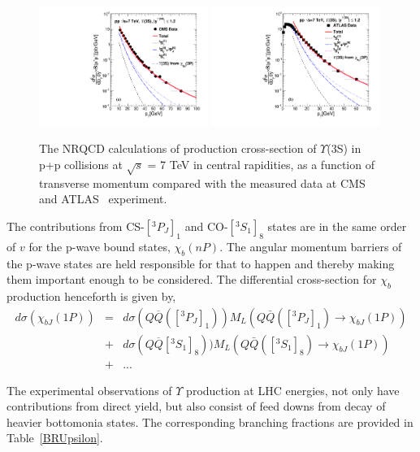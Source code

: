 \documentclass[review]{elsarticle}
\begin{document}
\begin{figure}[!h]
  \centering
  \includegraphics[width=0.49\textwidth]{Figures/NRQCD_Beauty/Fig1a_Y3S_CMS.pdf}
  \includegraphics[width=0.49\textwidth]{Figures/NRQCD_Beauty/Fig1b_Y3S_ATLAS.pdf} 
  \caption{\small{The NRQCD calculations of production cross-section of $\Upsilon$(3S) in p+p collisions at 
      $\sqrt{s}$ = 7 TeV in central rapidities, as a function of transverse momentum compared with the measured data 
      at CMS~\cite{Khachatryan:2015qpa} and ATLAS~\cite{Aad:2012dlq} experiment.} }
  \label{Fig:SigmaY3SCMS}
\end{figure}

The contributions from CS-$[^3P_J]_1$ and CO-$[^3S_1]_8$ states are in the same order
of $v$ for the p-wave bound states, $\chi_{b}(nP)$. The angular momentum barriers of the p-wave
states are held responsible for that to happen and thereby making them important enough
to be considered. The differential cross-section for $\chi_b$ production
henceforth is given by,
\begin{eqnarray}
  d\sigma(\chi_{bJ}(1P)) &=& d\sigma(Q\overline{Q}([^3P_J]_{1}))
  M_{L}(Q\bar{Q}([^3P_J]_{1})\rightarrow \chi_{bJ}(1P)) \nonumber \\
  &+& d\sigma(Q\overline{Q}[^3S_1]_{8}))
  M_{L}(Q\bar{Q}([^3S_1]_{8})\rightarrow \chi_{bJ}(1P))  \nonumber \\
  &+& ...
  \label{eq9}
\end{eqnarray}

The experimental observations of $\Upsilon$ production at LHC energies, not only have contributions from
direct yield, but also consist of feed downs from decay of heavier bottomonia states.
The corresponding branching fractions are
provided in Table~\ref{BRUpsilon}.
\end{document}
